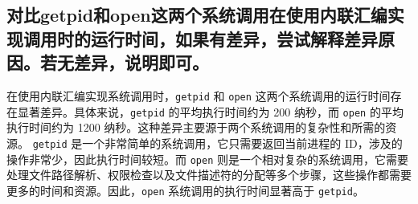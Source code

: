 \documentclass[11pt]{article}
\begin{document}
\subsection{对比getpid和open这两个系统调用在使用内联汇编实现调用时的运行时间，如果有差异，尝试解释差异原因。若无差异，说明即可。}

在使用内联汇编实现系统调用时，\texttt{getpid} 和 \texttt{open} 这两个系统调用的运行时间存在显著差异。具体来说，\texttt{getpid} 的平均执行时间约为 200 纳秒，而 \texttt{open} 的平均执行时间约为 1200 纳秒。这种差异主要源于两个系统调用的复杂性和所需的资源。
\texttt{getpid} 是一个非常简单的系统调用，它只需要返回当前进程的 ID，涉及的操作非常少，因此执行时间较短。而 \texttt{open} 则是一个相对复杂的系统调用，它需要处理文件路径解析、权限检查以及文件描述符的分配等多个步骤，这些操作都需要更多的时间和资源。因此，\texttt{open} 系统调用的执行时间显著高于 \texttt{getpid}。
\end{document}
